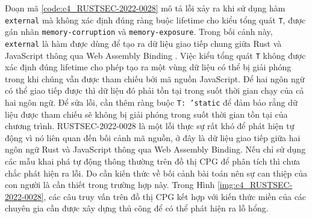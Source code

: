 Đoạn mã \ref{code:c4_RUSTSEC-2022-0028} mô tả lỗi xảy ra khi sử dụng hàm \texttt{external} mà không xác định đúng ràng buộc lifetime cho kiểu tổng quát \texttt{T}, được gán nhãn \texttt{memory-corruption} và \texttt{memory-exposure}.
Trong bối cảnh này, \texttt{external} là hàm được dùng để tạo ra dữ liệu giao tiếp chung giữa Rust và JavaScript thông qua Web Assembly Binding \cite{ githubGitHubRustwasmwasmbindgen}.
Việc kiểu tổng quát \texttt{T} không được xác định đúng lifetime cho phép tạo ra một vùng dữ liệu có thể bị giải phóng trong khi chúng vẫn được tham chiếu bởi mã nguồn JavaScript.
Để hai ngôn ngữ có thể giao tiếp được thì dữ liệu đó phải tồn tại trong suốt thời gian chạy của cả hai ngôn ngữ.
Để sửa lỗi, cần thêm ràng buộc \texttt{T: 'static} để đảm bảo rằng dữ liệu được tham chiếu sẽ không bị giải phóng trong suốt thời gian tồn tại của chương trình.
RUSTSEC-2022-0028 là một lỗi thực sự rất khó để phát hiện tự động vì nó liên quan đến bối cảnh mã nguồn, ở đây là dữ liệu giao tiếp giữa hai ngôn ngữ Rust và JavaScript thông qua Web Assembly Binding.
Nếu chỉ sử dụng các mẫu khai phá tự động thông thường trên đồ thị CPG để phân tích thì chưa chắc phát hiện ra lỗi.
Do cần kiến thức về bối cảnh bài toán nên sự can thiệp của con người là cần thiết trong trường hợp này.
Trong Hình \ref{img:c4_RUSTSEC-2022-0028}, các câu truy vấn trên đồ thị CPG kết hợp với kiến thức miền của các chuyên gia cần được xây dựng thủ công để có thể phát hiện ra lỗ hổng.




